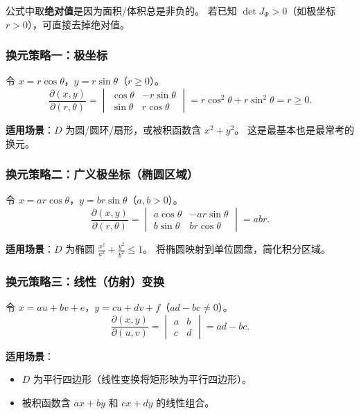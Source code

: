 \documentclass{ctexart}
\begin{document}
\begin{remark}
  公式中取\textbf{绝对值}是因为面积/体积总是非负的。
  若已知 $\det J_\Phi > 0$（如极坐标 $r > 0$），可直接去掉绝对值。
\end{remark}

\subsubsection*{换元策略一：极坐标}

令 $x = r\cos\theta$，$y = r\sin\theta$（$r \ge 0$）。
\[
  \frac{\partial(x,y)}{\partial(r,\theta)}
  = \begin{vmatrix} \cos\theta & -r\sin\theta \\ \sin\theta & r\cos\theta \end{vmatrix}
  = r\cos^2\theta + r\sin^2\theta = r \ge 0.
\]

\textbf{适用场景}：$D$ 为圆/圆环/扇形，或被积函数含 $x^2+y^2$。
这是最基本也是最常考的换元。

\subsubsection*{换元策略二：广义极坐标（椭圆区域）}

令 $x = ar\cos\theta$，$y = br\sin\theta$（$a, b > 0$）。
\[
  \frac{\partial(x,y)}{\partial(r,\theta)}
  = \begin{vmatrix} a\cos\theta & -ar\sin\theta \\ b\sin\theta & br\cos\theta \end{vmatrix}
  = abr.
\]

\textbf{适用场景}：$D$ 为椭圆 $\frac{x^2}{a^2}+\frac{y^2}{b^2} \le 1$。
将椭圆映射到单位圆盘，简化积分区域。

\subsubsection*{换元策略三：线性（仿射）变换}

令 $x = au + bv + e$，$y = cu + dv + f$（$ad - bc \ne 0$）。
\[
  \frac{\partial(x,y)}{\partial(u,v)}
  = \begin{vmatrix} a & b \\ c & d \end{vmatrix}
  = ad - bc.
\]

\textbf{适用场景}：
\begin{itemize}
  \item $D$ 为平行四边形（线性变换将矩形映为平行四边形）。
  \item 被积函数含 $ax+by$ 和 $cx+dy$ 的线性组合。
\end{itemize}
\end{document}
